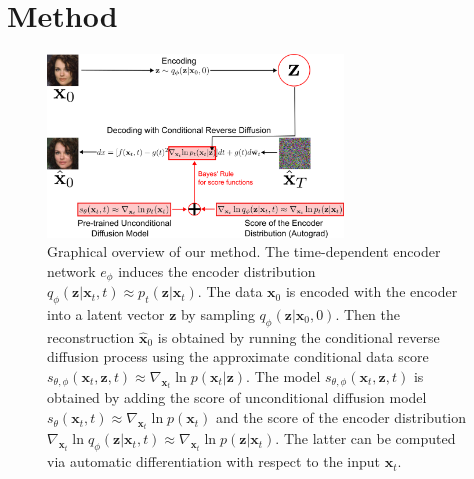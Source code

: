 \section{Method}

\begin{figure}
    \centering
    \includegraphics[width=0.7\textwidth]{Chapter4/figures/drawing.png}
    \caption{Graphical overview of our method. The time-dependent encoder network $e_\phi$ induces the encoder distribution $q_\phi( \textbf{z} | \textbf{x}_t, t) \approx p_t( \textbf{z} | \textbf{x}_t)$. The data $\textbf{x}_0$ is encoded with the encoder  into a latent vector $\textbf{z}$ by sampling $q_\phi( \textbf{z} | \textbf{x}_0, 0)$. Then the reconstruction $\hat{\textbf{x}}_0$ is obtained by running the conditional reverse diffusion process using the approximate conditional data score $s_{\theta, \phi}(\textbf{x}_t, \textbf{z},t) \approx \nabla_{\textbf{x}_t}  \ln{p(\textbf{x}_t | \textbf{z})}$. The model $s_{\theta, \phi}(\textbf{x}_t, \textbf{z},t)$ is obtained by adding the score of unconditional diffusion  model $s_\theta(\textbf{x}_t,t) \approx \nabla_{\textbf{x}_t}  \ln{p(\textbf{x}_t)} $ and the score of the encoder distribution $ \nabla_{\textbf{x}_t}  \ln q_\phi( \textbf{z} | \textbf{x}_t, t) \approx
 \nabla_{\textbf{x}_t}  \ln{p(\textbf{z} | \textbf{x}_t )} $. The latter can be computed via automatic differentiation with respect to the input $\textbf{x}_t$.}
\end{figure}

